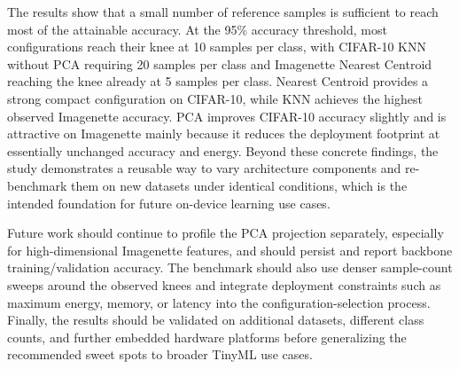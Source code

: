\documentclass[sigconf,review]{acmart}
\begin{document}
The results show that a small number of reference samples is sufficient to reach most of the attainable accuracy.
At the 95\% accuracy threshold, most configurations reach their knee at 10 samples per class, with CIFAR-10 KNN without PCA requiring 20 samples per class and Imagenette Nearest Centroid reaching the knee already at 5 samples per class.
Nearest Centroid provides a strong compact configuration on CIFAR-10, while KNN achieves the highest observed Imagenette accuracy.
PCA improves CIFAR-10 accuracy slightly and is attractive on Imagenette mainly because it reduces the deployment footprint at essentially unchanged accuracy and energy.
Beyond these concrete findings, the study demonstrates a reusable way to vary architecture components and re-benchmark them on new datasets under identical conditions, which is the intended foundation for future on-device learning use cases.

Future work should continue to profile the PCA projection separately, especially for high-dimensional Imagenette features, and should persist and report backbone training/validation accuracy.
The benchmark should also use denser sample-count sweeps around the observed knees and integrate deployment constraints such as maximum energy, memory, or latency into the configuration-selection process.
Finally, the results should be validated on additional datasets, different class counts, and further embedded hardware platforms before generalizing the recommended sweet spots to broader TinyML use cases.





\end{document}
